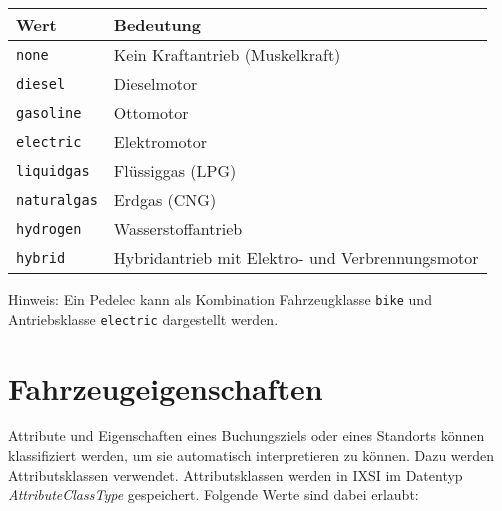 \begin{flushleft}
\begin{tabularx}{\linewidth}{l>{\raggedright\arraybackslash}X} 
\toprule
Wert & Bedeutung\\
\midrule
\verb|none| & Kein Kraftantrieb (Muskelkraft)\\
\verb|diesel| & Dieselmotor\\
\verb|gasoline| & Ottomotor\\
\verb|electric| & Elektromotor\\
\verb|liquidgas| & Flüssiggas (LPG)\\
\verb|naturalgas| & Erdgas (CNG)\\
\verb|hydrogen| & Wasserstoffantrieb\\
\verb|hybrid| & Hybridantrieb mit Elektro- und Verbrennungsmotor\\
\bottomrule
\end{tabularx}
\end{flushleft}

Hinweis: Ein Pedelec kann als Kombination Fahrzeugklasse \verb|bike| und Antriebsklasse \verb|electric| dargestellt werden.

\section{Fahrzeugeigenschaften}
\label{sec:CodeTabellen:AttributeClass}
Attribute und Eigenschaften eines Buchungsziels oder eines Standorts können klassifiziert werden, um sie automatisch interpretieren zu können. Dazu werden Attributsklassen verwendet. Attributsklassen werden in IXSI im Datentyp \emph{AttributeClassType} gespeichert. Folgende Werte sind dabei erlaubt:

